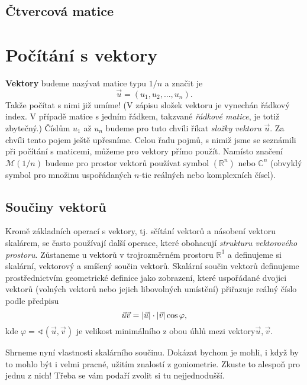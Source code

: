     \subsection{Čtvercová matice}\label{mai:IchapIIsecIIIsubIV}
  \section{Počítání s vektory}\label{mai:IchapIIsecIV}
    \textbf{Vektory} budeme nazývat matice typu \(1/n\) a značit je
    \begin{equation*}
      \vec{u} = (u_1, u_2, \ldots, u_n).
    \end{equation*}
    Takže počítat s nimi již umíme! (V zápisu složek vektoru je vynechán řádkový index. V případě 
    matice s jedním řádkem, takzvané \emph{řádkové matice}, je totiž zbytečný.) Číslům \(u_1\) až 
    \(u_n\) budeme pro tuto chvíli říkat \emph{složky vektoru} \(\vec{u}\). Za chvíli tento pojem 
    ještě upřesníme. Celou řadu pojmů, s nimiž jsme se seznámili při počítání s maticemi, můžeme 
    pro vektory přímo použít. Namísto značení \(\mathcal{M} (1/n)\) budeme pro prostor vektorů 
    používat symbol \((\mathbb{R}^n)\) nebo \(\mathbb{C}^n\) (obvyklý symbol pro množinu 
    uspořádaných \(n\)-tic reálných nebo komplexních čísel).
    
    \subsection{Součiny vektorů}
      Kromě základních operací s vektory, tj. sčítání vektorů a násobení vektoru skalárem, se 
      často používají další operace, které obohacují \emph{strukturu vektorového prostoru}. 
      Zůstaneme u vektorů v trojrozměrném prostoru \(\mathbb{R}^3\) a definujeme si skalární, 
      vektorový a smíšený součin vektorů. Skalární součin vektorů definujeme prostřednictvím 
      geometrické definice jako zobrazení, které uspořádané dvojici vektorů (volných vektorů nebo 
      jejich libovolných umístění) přiřazuje reálný číslo podle předpisu
      \begin{equation}\label{mai:eq038}
        \vec{u}\vec{v} = \lvert\vec{u}\rvert\cdot\lvert\vec{v}\rvert\cos\varphi,
      \end{equation}
      kde \(\varphi = \sphericalangle(\vec{u},\vec{v})\) je velikost minimálního z obou úhlů mezi 
      vektory\(\vec{u},\vec{v}\).

    
    
    Shrneme nyní vlastnosti skalárního součinu. Dokázat bychom je mohli, i když by to mohlo být i 
    velmi pracné, užitím znalostí z goniometrie. Zkuste to alespoň pro jednu z nich! Třeba se    
    vám podaří zvolit si tu nejjednodušší.

\printbibliography[title={Seznam literatury}, heading=subbibliography]
